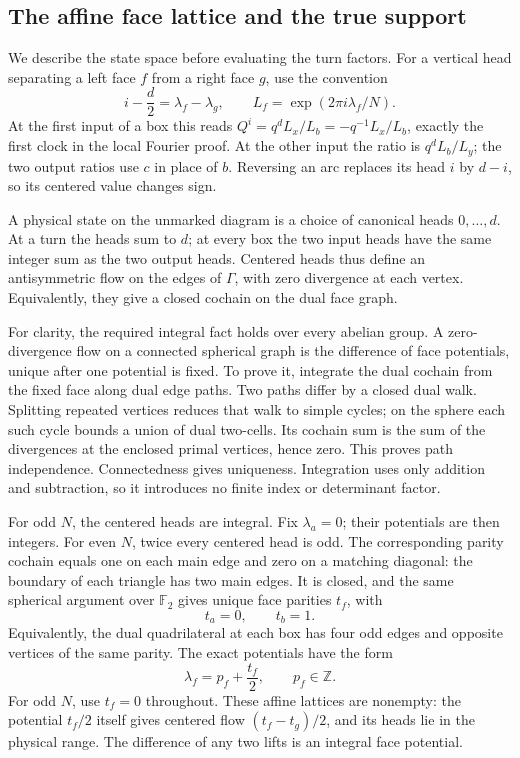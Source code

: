 \subsection{The affine face lattice and the true support}

We describe the state space before evaluating the turn factors.
For a vertical head separating a left face \(f\) from a right
face \(g\), use the convention
\begin{equation}\label{de:centered-flow}
 i-\frac d2=\lambda_f-\lambda_g,\qquad
 L_f=\exp(2\pi i\lambda_f/N).
\end{equation}
At the first input of a box this reads
\(Q^i=q^dL_x/L_b=-q^{-1}L_x/L_b\), exactly the first
clock in the local Fourier proof. At the other input the ratio
is \(q^dL_b/L_y\); the two output ratios use \(c\) in place of
\(b\). Reversing an arc replaces its head \(i\) by \(d-i\),
so its centered value changes sign.

A physical state on the unmarked diagram is a choice of canonical
heads \(0,\ldots,d\). At a turn the heads sum to \(d\); at every
box the two input heads have the same integer sum as the two
output heads. Centered heads thus define an antisymmetric flow
on the edges of \(\Gamma\), with zero divergence at each vertex.
Equivalently, they give a closed cochain on the dual face graph.

For clarity, the required integral fact holds over every
abelian group. A zero-divergence flow on a connected spherical
graph is the difference of face potentials, unique after one
potential is fixed. To prove it, integrate the dual cochain from
the fixed face along dual edge paths. Two paths differ by a
closed dual walk. Splitting repeated vertices reduces that walk
to simple cycles; on the sphere each such cycle bounds a union
of dual two-cells. Its cochain sum is the sum of the divergences
at the enclosed primal vertices, hence zero. This proves
path independence. Connectedness gives uniqueness. Integration
uses only addition and subtraction, so it introduces no finite
index or determinant factor.

For odd \(N\), the centered heads are integral. Fix
\(\lambda_a=0\); their potentials are then integers. For even
\(N\), twice every centered head is odd. The corresponding
parity cochain equals one on each main edge and zero on a
matching diagonal: the boundary of each triangle has two
main edges. It is closed, and the same spherical argument over
\(\mathbb F_2\) gives unique face parities \(t_f\), with
\[
 t_a=0,\qquad t_b=1.
\]
Equivalently, the dual quadrilateral at each box has four odd
edges and opposite vertices of the same parity. The exact
potentials have the form
\begin{equation}\label{de:affine-potentials}
                  \lambda_f=p_f+\frac{t_f}{2},
                  \qquad p_f\in\mathbb Z.
\end{equation}
For odd \(N\), use \(t_f=0\) throughout. These affine lattices are
nonempty: the potential \(t_f/2\) itself gives centered flow
\((t_f-t_g)/2\), and its heads lie in the physical range.
The difference of any two lifts is an integral face potential.

